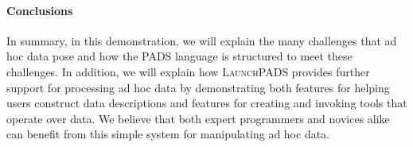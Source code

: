 \documentclass[nocopyrightspace]{sigplanconf}
\begin{document}


\paragraph*{Conclusions} 
In summary, in this demonstration, we will explain the many challenges
that ad hoc data pose and how the \textsc{PADS} language is
structured to meet these challenges.  In addition, we will explain how
\textsc{LaunchPADS} provides further support for processing ad hoc
data by demonstrating both features for helping users construct data
descriptions and features for creating and invoking tools that operate
over data.  We believe that both expert programmers and novices alike
can benefit from this simple system for manipulating ad hoc data.



\small
 
\end{document}
